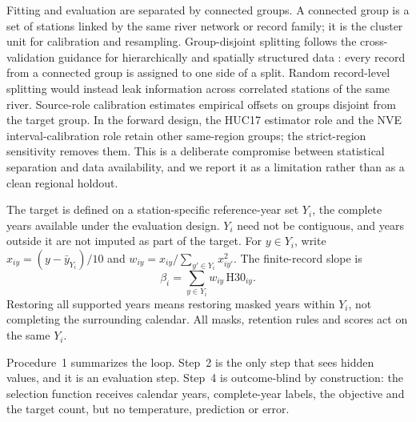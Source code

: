 Fitting and evaluation are separated by connected groups. A connected group is a set of stations linked by the same river network or record family; it is the cluster unit for calibration and resampling. Group-disjoint splitting follows the cross-validation guidance for hierarchically and spatially structured data \citep{roberts2017}: every record from a connected group is assigned to one side of a split. Random record-level splitting would instead leak information across correlated stations of the same river. Source-role calibration estimates empirical offsets on groups disjoint from the target group. In the forward design, the HUC17 estimator role and the NVE interval-calibration role retain other same-region groups; the strict-region sensitivity removes them. This is a deliberate compromise between statistical separation and data availability, and we report it as a limitation rather than as a clean regional holdout.

The target is defined on a station-specific reference-year set $Y_i$, the complete years available under the evaluation design. $Y_i$ need not be contiguous, and years outside it are not imputed as part of the target. For $y\in Y_i$, write $x_{iy}=(y-\bar y_{Y_i})/10$ and $w_{iy}=x_{iy}/\sum_{y'\in Y_i}x_{iy'}^2$. The finite-record slope is
\begin{equation}
\beta_i=\sum_{y\in Y_i}w_{iy}\,\mathrm{H30}_{iy}.
\label{eq:beta}
\end{equation}
Restoring all supported years means restoring masked years within $Y_i$, not completing the surrounding calendar. All masks, retention rules and scores act on the same $Y_i$.

Procedure~1 summarizes the loop. Step~2 is the only step that sees hidden values, and it is an evaluation step. Step~4 is outcome-blind by construction: the selection function receives calendar years, complete-year labels, the objective and the target count, but no temperature, prediction or error.

